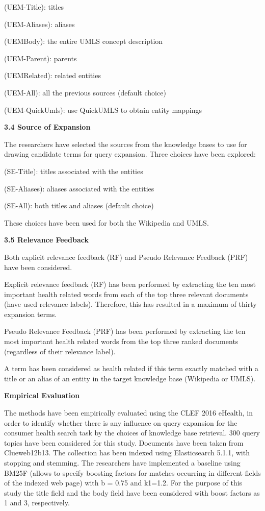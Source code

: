 \documentclass[]{article}
\begin{document}
(UEM-Title): titles

(UEM-Aliases): aliases

(UEMBody): the entire UMLS concept description

(UEM-Parent): parents

(UEMRelated): related entities

(UEM-All): all the previous sources (default choice)

(UEM-QuickUmls): use QuickUMLS to obtain entity mappings

\textbf{3.4 Source of Expansion}


The researchers have selected the sources from the knowledge bases to use for drawing candidate terms for query expansion. Three choices have been explored:

(SE-Title): titles associated with the entities

(SE-Aliases): aliases associated with the entities

(SE-All): both titles and aliases (default choice)
 
These choices have been used for both the Wikipedia and UMLS.

\textbf{3.5 Relevance Feedback}

Both explicit relevance feedback (RF) and Pseudo Relevance Feedback (PRF) have been considered.
 
Explicit relevance feedback (RF) has been performed by extracting the ten most important health related words from each of the top three relevant documents (have used relevance labels). Therefore, this has resulted in a maximum of thirty expansion terms.

Pseudo Relevance Feedback (PRF) has been performed by extracting the ten most important health related words from the top three ranked documents (regardless of their relevance label). 

A term has been considered as health related if this term exactly matched with a title or an alias of an entity in the target knowledge base (Wikipedia or UMLS). 

\textbf{Empirical Evaluation}

The methods have been empirically evaluated using the CLEF 2016 eHealth, in order to identify whether there is any influence on query expansion for the consumer health search task by the choices of knowledge base retrieval. 300 query topics have been considered for this study. Documents have been taken from Clueweb12b13. The collection has been indexed using Elasticsearch 5.1.1, with stopping and stemming. The researchers have implemented a baseline using BM25F (allows to specify boosting factors for matches occurring in different fields of the indexed web page) with b = 0.75 and k1=1.2. For the purpose of this study the title field and the body field have been considered with boost factors as 1 and 3, respectively.        
\end{document}
